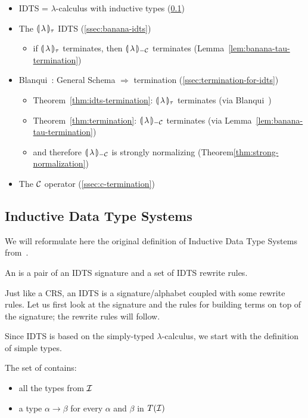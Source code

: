 \begin{itemize}
\item IDTS = $\lambda$-calculus with inductive types (\ref{ssec:idts})
\item The ${\llparenthesis \, \lambda \, \rrparenthesis_\tau}$ IDTS (\ref{ssec:banana-idts})
  \begin{itemize}
  \item if ${\llparenthesis \, \lambda \, \rrparenthesis_\tau}$ terminates, then ${\llparenthesis \, \lambda \, \rrparenthesis_{-\mathcal{C}}}$ terminates
    (Lemma~\ref{lem:banana-tau-termination})
  \end{itemize}
\item Blanqui~\cite{blanqui2002inductive}: General Schema $\Rightarrow$ termination
  (\ref{ssec:termination-for-idts})
  \begin{itemize}
  \item Theorem~\ref{thm:idts-termination}: ${\llparenthesis \, \lambda \, \rrparenthesis_\tau}$ terminates (via Blanqui~\cite{blanqui2002inductive})
  \item Theorem~\ref{thm:termination}: ${\llparenthesis \, \lambda \, \rrparenthesis_{-\mathcal{C}}}$ terminates (via
    Lemma~\ref{lem:banana-tau-termination})
  \item and therefore ${\llparenthesis \, \lambda \, \rrparenthesis_{-\mathcal{C}}}$ is strongly normalizing
    (Theorem\ref{thm:strong-normalization})
  \end{itemize}
\item The $\mathcal{C}$ operator (\ref{ssec:c-termination})
\end{itemize}


\subsection{Inductive Data Type Systems}
\label{ssec:idts}

We will reformulate here the original definition of Inductive Data Type
Systems from~\cite{blanqui2002inductive}.

\begin{definition}
  An  is a pair of an IDTS
  signature and a set of IDTS rewrite rules.
\end{definition}

Just like a CRS, an IDTS is a signature/alphabet coupled with some rewrite
rules. Let us first look at the signature and the rules for building terms
on top of the signature; the rewrite rules will follow.

Since IDTS is based on the simply-typed $\lambda$-calculus, we start with
the definition of simple types.

\begin{definition}
  The set of  contains:
  \begin{itemize}
  \item all the types from $\mathcal{I}$
  \item a type $\alpha \to \beta$ for every $\alpha$ and $\beta$ in $T(\mathcal{I})$
  \end{itemize}
\end{definition}

